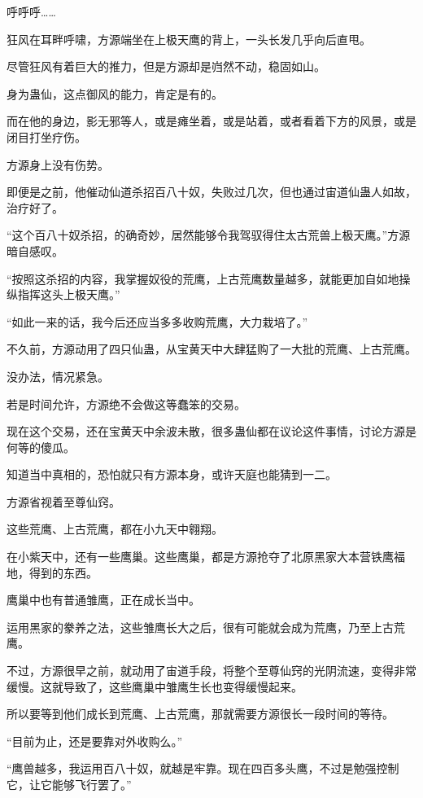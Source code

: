 
\begin{this_body}

呼呼呼……

狂风在耳畔呼啸，方源端坐在上极天鹰的背上，一头长发几乎向后直甩。

尽管狂风有着巨大的推力，但是方源却是岿然不动，稳固如山。

身为蛊仙，这点御风的能力，肯定是有的。

而在他的身边，影无邪等人，或是瘫坐着，或是站着，或者看着下方的风景，或是闭目打坐疗伤。

方源身上没有伤势。

即便是之前，他催动仙道杀招百八十奴，失败过几次，但也通过宙道仙蛊人如故，治疗好了。

“这个百八十奴杀招，的确奇妙，居然能够令我驾驭得住太古荒兽上极天鹰。”方源暗自感叹。

“按照这杀招的内容，我掌握奴役的荒鹰，上古荒鹰数量越多，就能更加自如地操纵指挥这头上极天鹰。”

“如此一来的话，我今后还应当多多收购荒鹰，大力栽培了。”

不久前，方源动用了四只仙蛊，从宝黄天中大肆猛购了一大批的荒鹰、上古荒鹰。

没办法，情况紧急。

若是时间允许，方源绝不会做这等蠢笨的交易。

现在这个交易，还在宝黄天中余波未散，很多蛊仙都在议论这件事情，讨论方源是何等的傻瓜。

知道当中真相的，恐怕就只有方源本身，或许天庭也能猜到一二。

方源省视着至尊仙窍。

这些荒鹰、上古荒鹰，都在小九天中翱翔。

在小紫天中，还有一些鹰巢。这些鹰巢，都是方源抢夺了北原黑家大本营铁鹰福地，得到的东西。

鹰巢中也有普通雏鹰，正在成长当中。

运用黑家的豢养之法，这些雏鹰长大之后，很有可能就会成为荒鹰，乃至上古荒鹰。

不过，方源很早之前，就动用了宙道手段，将整个至尊仙窍的光阴流速，变得非常缓慢。这就导致了，这些鹰巢中雏鹰生长也变得缓慢起来。

所以要等到他们成长到荒鹰、上古荒鹰，那就需要方源很长一段时间的等待。

“目前为止，还是要靠对外收购么。”

“鹰兽越多，我运用百八十奴，就越是牢靠。现在四百多头鹰，不过是勉强控制它，让它能够飞行罢了。”


\end{this_body}
